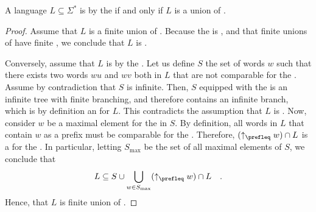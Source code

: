 %     

\begin{theorem}
    \label{prefixes:thm}
    A language $L \subseteq \Sigma^*$ is  by the
     if and only if $L$ is a union of .
\end{theorem}
\begin{proof}
    Assume that $L$ is a finite union of .
    Because the  is ,
    and that finite unions of  have finite ,
    we conclude that $L$ is .

    Conversely, assume that $L$ is  by the . Let us define $S$ the set of words $w$ such that there exists
    two words $wu$ and $wv$ both in $L$ that are not comparable for the
    . Assume by contradiction that $S$ is infinite.
    Then, $S$ equipped with the  is an infinite
    tree with finite branching, and therefore contains an infinite
    branch, which is by definition an  for $L$.
    This contradicts the assumption that $L$ is .
    Now, consider $w$ be a maximal element for the 
    in $S$. By definition, all words in $L$ that contain $w$ as a prefix
    must be comparable for the . Therefore,
    $(\upset[\prefleq]{w}) \cap L$ is a  for the .
    In particular, letting $S_{\max}$ be the set of all maximal elements
    of $S$,
    we conclude that 
    \begin{equation*}
        L \subseteq S \cup \bigcup_{w \in S_{\max}} (\upset[\prefleq]{w}) \cap L
        \quad .
    \end{equation*}
    Hence, that $L$ is finite union of .
\end{proof}

